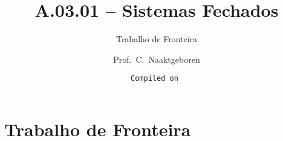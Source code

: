 \usepackage{beamerthemeCopenhagen}
\usepackage[utf8]{inputenc}
\usepackage[english,brazil]{babel} %
\usepackage{pslatex}
\usepackage{amssymb,amsmath}
\usepackage{soul}
\usepackage{xspace}
\newcommand{\enfa}[1]{{\color{enfa}{#1}}}
\newcommand{\gray}[1]{{\color{gray}{#1}}}
\newcommand{\txtpic}[1]{%
    \fcolorbox{lightgray}{white!90!black}{{#1}} 
}
\makeatletter
\immediate{} %
\makeatother
\title{A.03.01 -- Sistemas Fechados}
\subtitle{Trabalho de Fronteira}
\author{Prof.~C.~Naaktgeboren}
\date{\tt Compiled on }

    \frame{\titlepage}
\section{Trabalho de Fronteira}


